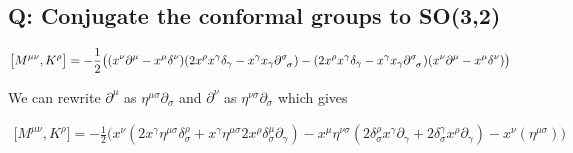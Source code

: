 \subsection{Q: Conjugate the conformal groups to SO(3,2)}


\begin{gather*}
\big[ M^{\mu \nu}, K^\rho  \big]= -\frac{1}{2}\big((x^\nu \partial^\mu -x^\mu \delta^\nu)(2x^\rho x^\gamma \delta_\gamma- x^\gamma x_\gamma \partial \ein{\sigma}{\sigma} )-(2x^\rho x^\gamma \delta_\gamma- x^\gamma x_\gamma \partial \ein{\sigma}{\sigma} )(x^\nu \partial^\mu -x^\mu \delta^\nu) \big) \\
\end{gather*}

We can rewrite $ \partial^\mu $ as $ \eta ^{\mu \sigma} \partial_ \sigma $ and $ \partial^\nu $ as $ \eta ^{\nu \sigma} \partial_ \sigma $ which gives

\begin{gather*}
\big[ M^{\mu \nu}, K^\rho  \big]= -\frac{1}{2} \big( x^\nu (2x^\gamma \eta^{\mu \sigma} \delta^{\rho}_{\sigma}+x^\gamma \eta^{\mu \sigma}2 x^\rho \delta^\mu _\sigma \partial_\gamma)-x^\mu\eta^{\nu \sigma}(2 \delta^\rho _\sigma x^\gamma \partial_\gamma +2\delta^\gamma_\sigma x^\rho \partial_\gamma)- x^\nu(\eta^{\mu \sigma}) \big)
\end{gather*}